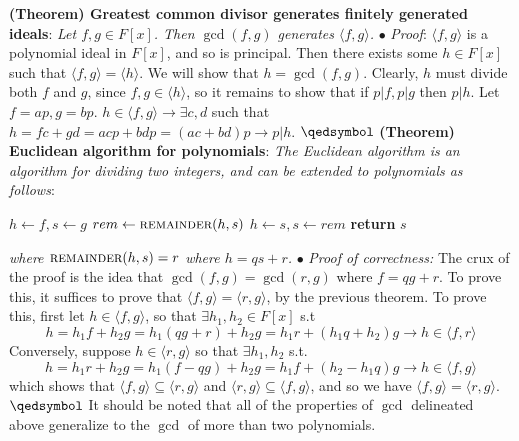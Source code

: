 \documentclass{article}
\begin{document}
\textbf{(Theorem) Greatest common divisor generates finitely generated ideals}: \textit{Let $ f, g \in F[x] $. Then $ \gcd(f, g) $ generates $ \langle f, g \rangle $.}
\newline
\indent $ \bullet $ \textit{Proof}: $ \langle f, g \rangle $ is a polynomial ideal in $ F[x] $, and so is principal. Then there exists some $ h \in F[x] $ such that $ \langle f, g \rangle = \langle h \rangle $. We will show that $ h = \gcd(f, g) $. Clearly, $ h $ must divide both $ f $ and $ g $, since $ f, g \in \langle h \rangle $, so it remains to show that if $ p | f, p | g $ then $ p | h $. Let $ f = a p, g = b p $. $ h \in \langle f, g \rangle \rightarrow \exists c, d $ such that $ h = f c + g d = a c p + b d p = (a c + b d) p \rightarrow p | h $. $ \qedsymbol $
\newline \newline
\textbf{(Theorem) Euclidean algorithm for polynomials}: \textit{The Euclidean algorithm is an algorithm for dividing two integers, and can be extended to polynomials as follows}:
\begin{algorithmic}
		\State $ h \gets f, s \gets g $
			\State $ rem \gets \textproc{remainder}(h, s) $
			\State $ h \gets s, s \gets rem $
		\EndWhile
		\State \textbf{return} $ s $
	\EndProcedure
\end{algorithmic}
\indent \textit{where $ \textproc{remainder}(h, s) = r $ where $ h = q s + r $.}
\newline
\indent $ \bullet $ \textit{Proof of correctness:} The crux of the proof is the idea that $ \gcd(f, g) = \gcd(r, g) $ where $ f = q g + r $. To prove this, it suffices to prove that $ \langle f, g \rangle = \langle r, g \rangle $, by the previous theorem. To prove this, first let $ h \in \langle f, g \rangle $, so that $ \exists h_1, h_2 \in F[x] $ s.t
$$ h = h_1 f + h_2 g = h_1 \left( q g + r \right) + h_2 g = h_1 r + \left( h_1 q + h_2 \right) g \rightarrow h \in \langle f, r \rangle $$
Conversely, suppose $ h \in \langle r, g \rangle $ so that $ \exists h_1, h_2 $ s.t.
$$ h = h_1 r + h_2 g = h_1 \left( f - q g \right) + h_2 g = h_1 f + \left( h_2 - h_1 q \right) g \rightarrow h \in \langle f, g \rangle $$
which shows that $ \langle f, g \rangle \subseteq \langle r, g \rangle $ and $ \langle r, g \rangle \subseteq \langle f, g \rangle $, and so we have $ \langle f, g \rangle = \langle r, g \rangle $. $ \qedsymbol $
\newline \newline
It should be noted that all of the properties of $ \gcd $ delineated above generalize to the $ \gcd $ of more than two polynomials.
\end{document}
